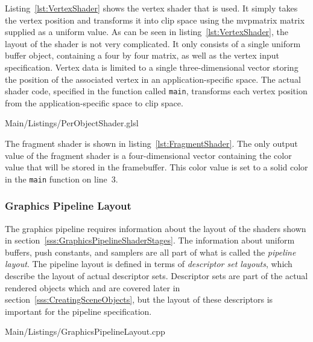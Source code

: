         Listing~\ref{lst:VertexShader} shows the vertex shader that is used.
        It simply takes the vertex position and transforms it into clip space using the \gls{mvpmatrix} matrix supplied as a uniform value.
        As can be seen in listing~\ref{lst:VertexShader}, the layout of the shader is not very complicated.
        It only consists of a single uniform buffer object, containing a four by four matrix, as well as the vertex input specification.
        Vertex data is limited to a single three-dimensional vector storing the position of the associated vertex in an application-specific space.
        The actual shader code, specified in the function called \lstinline{main}, transforms each vertex position from the application-specific space to clip space.

        
        {Main/Listings/PerObjectShader.glsl}

        The fragment shader is shown in listing~\ref{lst:FragmentShader}.
        The only output value of the fragment shader is a four-dimensional vector containing the color value that will be stored in the framebuffer.
        This color value is set to a solid color in the \lstinline{main} function on line~3.

      \subsubsection{Graphics Pipeline Layout}
      \label{sss:GraphicsPipelineLayout}
        The graphics pipeline requires information about the layout of the shaders shown in section~\ref{sss:GraphicsPipelineShaderStages}.
        The information about uniform buffers, push constants, and samplers are all part of what is called the \textit{pipeline layout}.
        The pipeline layout is defined in terms of \textit{descriptor set layouts}, which describe the layout of actual descriptor sets.
        Descriptor sets are part of the actual rendered objects which and are covered later in section~\ref{sss:CreatingSceneObjects}, but the layout of these descriptors is important for the pipeline specification.

        
        {Main/Listings/GraphicsPipelineLayout.cpp}

